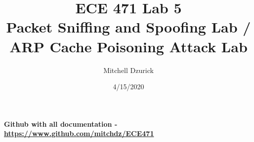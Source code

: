\documentclass[12pt]{article}
\title {{\bf ECE 471 Lab 5} \\
\large{Packet Sniffing and Spoofing Lab / ARP Cache Poisoning Attack Lab
}}
\author{Mitchell Dzurick}
\date{4/15/2020}
\begin{document}
\maketitle
\textbf{Github with all documentation - \url{https://www.github.com/mitchdz/ECE471}}
\tableofcontents 
\clearpage
\end{document}
